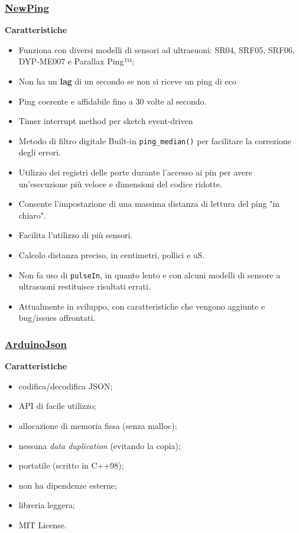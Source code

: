 \subsubsection{\underline{\href{http://playground.arduino.cc/Code/NewPing}{NewPing}}}\label{sec:newping}
\textbf{Caratteristiche}
\begin{itemize}
	\item Funziona con diversi modelli di sensori ad ultrasuoni: SR04, SRF05, SRF06, DYP-ME007 e Parallax Ping™;
	\item Non ha un \textbf{lag} di un secondo se non si riceve un ping di eco
	\item Ping coerente e affidabile fino a 30 volte al secondo.
	\item Timer interrupt method per sketch event-driven
	\item Metodo di filtro digitale Built-in \texttt{ping\_median()} per facilitare la correzione degli errori.
	\item Utilizzo dei registri delle porte durante l'accesso ai pin per avere un'esecuzione più veloce e dimensioni del codice ridotte.
	\item Consente l'impostazione di una massima distanza di lettura del ping "in chiaro".
	\item Facilita l'utilizzo di più sensori.
	\item Calcolo distanza preciso, in centimetri, pollici e uS.
	\item Non fa uso di \texttt{pulseIn}, in quanto lento e con alcuni modelli di sensore a ultrasuoni restituisce risultati errati.
	\item Attualmente in sviluppo, con caratteristiche che vengono aggiunte e bug/issues affrontati.
\end{itemize}

\subsubsection{\underline{\href{https://github.com/bblanchon/ArduinoJson}{ArduinoJson}}}\label{sec:arduinojason}
\textbf{Caratteristiche}
\begin{itemize}
	\item codifica/decodifica JSON;
	\item API di facile utilizzo;
	\item allocazione di memoria fissa (senza malloc);
	\item nessuna \textit{data duplication} (evitando la copia);
	\item portatile (scritto in C++98);
	\item non ha dipendenze esterne;
	\item libreria leggera;
	\item MIT License.
\end{itemize}

